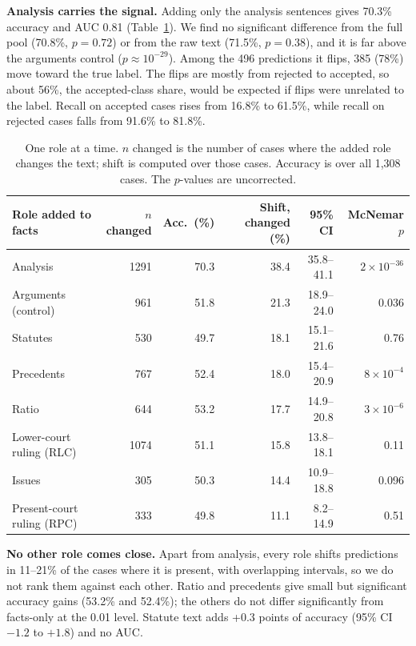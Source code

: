 \documentclass[conference]{IEEEtran}
\begin{document}
\textbf{Analysis carries the signal.} Adding only the analysis sentences gives 70.3\% accuracy and AUC 0.81 (Table~\ref{tab:roles}). We find no significant difference from the full pool (70.8\%, $p=0.72$) or from the raw text (71.5\%, $p=0.38$), and it is far above the arguments control ($p\approx10^{-29}$). Among the 496 predictions it flips, 385 (78\%) move toward the true label. The flips are mostly from rejected to accepted, so about 56\%, the accepted-class share, would be expected if flips were unrelated to the label. Recall on accepted cases rises from 16.8\% to 61.5\%, while recall on rejected cases falls from 91.6\% to 81.8\%.

\begin{table}[t]
\caption{One role at a time. $n$ changed is the number of cases where the added role changes the text; shift is computed over those cases. Accuracy is over all 1,308 cases. The $p$-values are uncorrected.}
\label{tab:roles}
\centering
\small
\begin{tabular}{lrrrrr}
\toprule
\textbf{Role added to facts} & \textbf{$n$ changed} & \textbf{Acc.\ (\%)} & \textbf{Shift, changed (\%)} & \textbf{95\% CI} & \textbf{McNemar $p$} \\
\midrule
Analysis & 1291 & 70.3 & 38.4 & 35.8--41.1 & $2\times10^{-36}$ \\
Arguments (control) & 961 & 51.8 & 21.3 & 18.9--24.0 & 0.036 \\
Statutes & 530 & 49.7 & 18.1 & 15.1--21.6 & 0.76 \\
Precedents & 767 & 52.4 & 18.0 & 15.4--20.9 & $8\times10^{-4}$ \\
Ratio & 644 & 53.2 & 17.7 & 14.9--20.8 & $3\times10^{-6}$ \\
Lower-court ruling (RLC) & 1074 & 51.1 & 15.8 & 13.8--18.1 & 0.11 \\
Issues & 305 & 50.3 & 14.4 & 10.9--18.8 & 0.096 \\
Present-court ruling (RPC) & 333 & 49.8 & 11.1 & 8.2--14.9 & 0.51 \\
\bottomrule
\end{tabular}
\end{table}

\textbf{No other role comes close.} Apart from analysis, every role shifts predictions in 11--21\% of the cases where it is present, with overlapping intervals, so we do not rank them against each other. Ratio and precedents give small but significant accuracy gains (53.2\% and 52.4\%); the others do not differ significantly from facts-only at the 0.01 level. Statute text adds +0.3 points of accuracy (95\% CI $-1.2$ to $+1.8$) and no AUC.
\end{document}
